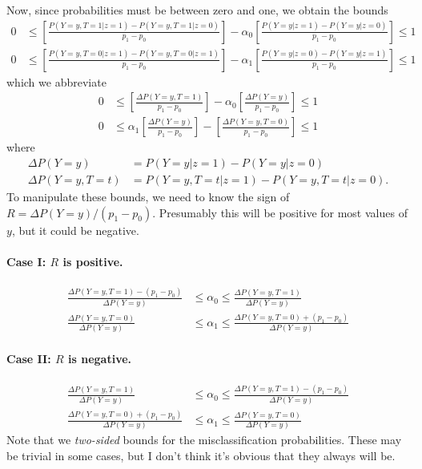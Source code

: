 \documentclass[12pt]{article}
\begin{document}
\normalsize
Now, since probabilities must be between zero and one, we obtain the bounds
\begin{align*}
  0 &\leq \left[ \frac{P(Y = y,T=1|z=1) - P(Y = y,T=1|z=0)}{p_1 - p_0} \right] - \alpha_0 \left[ \frac{P(Y = y|z=1) - P(Y = y|z=0)}{p_1 - p_0} \right] \leq 1\\ 
  0 &\leq \left[ \frac{P(Y = y,T=0|z=1) - P(Y = y,T=0|z=1)}{p_1 - p_0} \right] - \alpha_1 \left[ \frac{P(Y=y|z=0) - P(Y=y|z=1)}{p_1 - p_0} \right] \leq 1 
\end{align*}
\normalsize
which we abbreviate 
\begin{align*}
  0 &\leq \left[ \frac{\Delta P(Y=y,T=1)}{p_1 - p_0} \right] - \alpha_0 \left[ \frac{\Delta P(Y=y)}{p_1 - p_0} \right] \leq 1\\ 
  0 &\leq \alpha_1 \left[ \frac{\Delta P(Y=y)}{p_1 - p_0} \right] - \left[\frac{ \Delta P(Y=y,T=0)}{p_1 - p_0} \right] \leq 1 
\end{align*}
where
\begin{align*}
  \Delta P(Y=y) &= P(Y=y|z=1) - P(Y=y|z=0)\\
  \Delta P(Y=y, T=t) &= P(Y=y, T=t|z=1) - P(Y=y,T=t|z=0).
\end{align*}
To manipulate these bounds, we need to know the sign of $R = \Delta P(Y=y)/(p_1 - p_0)
$. 
Presumably this will be positive for most values of $y$, but it could be negative.
\paragraph{Case I: $R$ is positive.}
\begin{align*}
  \frac{\Delta P(Y=y,T=1) - (p_1 - p_0)}{\Delta P(Y=y)} &\leq \alpha_0 \leq \frac{\Delta P(Y=y,T=1)}{\Delta P(Y=y)}\\
  \frac{\Delta P(Y=y,T=0)}{\Delta P(Y=y)} &\leq \alpha_1 \leq \frac{\Delta P(Y=y,T=0) + (p_1 - p_0)}{\Delta P(Y=y)}
\end{align*}

\paragraph{Case II: $R$ is negative.}
\begin{align*}
  \frac{\Delta P(Y=y,T=1)}{\Delta P(Y=y)} &\leq \alpha_0 \leq \frac{\Delta P(Y=y,T=1) - (p_1 - p_0)}{\Delta P(Y=y)} \\
  \frac{\Delta P(Y=y,T=0) + (p_1 - p_0)}{\Delta P(Y=y)} &\leq \alpha_1 \leq \frac{\Delta P(Y=y,T=0)}{\Delta P(Y=y)}
\end{align*}
Note that we \emph{two-sided} bounds for the misclassification probabilities.
These may be trivial in some cases, but I don't think it's obvious that they always will be.
\end{document}
